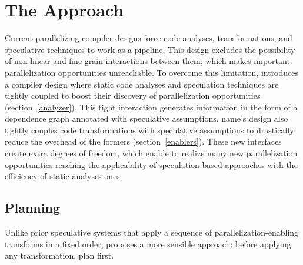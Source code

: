 \section{The \name Approach}
\label{sec:approach}

Current parallelizing compiler designs force code analyses, transformations, and speculative techniques to work as a pipeline.
This design excludes the possibility of non-linear and fine-grain interactions between them, which makes important parallelization opportunities unreachable.
To overcome this limitation, \name introduces a compiler design where static code analyses and speculation techniques are tightly coupled to boost their discovery of parallelization opportunities (section~\ref{analyzer}).
This tight interaction generates information in the form of a dependence graph annotated with speculative assumptions.
name's design also tightly couples code transformations with speculative assumptions to drastically reduce the overhead of the formers (section~\ref{enablers}).
These new interfaces create extra degrees of freedom, which enable \name to realize many new parallelization opportunities reaching the applicability of speculation-based approaches with the efficiency of static analyses ones.


\subsection{Planning}
%
Unlike prior speculative systems that apply a sequence of
parallelization-enabling transforms in a fixed order, \name proposes a
more sensible approach: before applying any transformation, plan
first.

